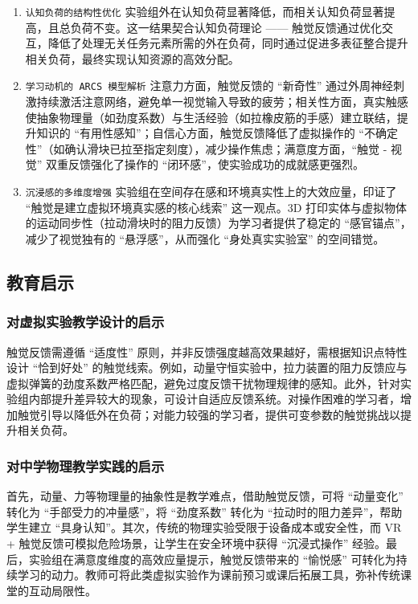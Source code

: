 \documentclass[runningheads]{llncs}
\begin{document}
\begin{enumerate}[label={\arabic*)}]
  \item \texttt{认知负荷的结构性优化} 实验组外在认知负荷显著降低，而相关认知负荷显著提高，且总负荷不变。这一结果契合认知负荷理论 —— 触觉反馈通过优化交互，降低了处理无关任务元素所需的外在负荷，同时通过促进多表征整合提升相关负荷，最终实现认知资源的高效分配。
  \item \texttt{学习动机的 ARCS 模型解析} 注意力方面，触觉反馈的 “新奇性” 通过外周神经刺激持续激活注意网络，避免单一视觉输入导致的疲劳；相关性方面，真实触感使抽象物理量（如劲度系数）与生活经验（如拉橡皮筋的手感）建立联结，提升知识的 “有用性感知”；自信心方面，触觉反馈降低了虚拟操作的 “不确定性”（如确认滑块已拉至指定刻度），减少操作焦虑；满意度方面，“触觉 - 视觉” 双重反馈强化了操作的 “闭环感”，使实验成功的成就感更强烈。
  \item \texttt{沉浸感的多维度增强} 实验组在空间存在感和环境真实性上的大效应量，印证了 “触觉是建立虚拟环境真实感的核心线索” 这一观点。3D 打印实体与虚拟物体的运动同步性（拉动滑块时的阻力反馈）为学习者提供了稳定的 “感官锚点”，减少了视觉独有的 “悬浮感”，从而强化 “身处真实实验室” 的空间错觉。
\end{enumerate}

\subsection{教育启示}
\subsubsection{对虚拟实验教学设计的启示}
触觉反馈需遵循 “适度性” 原则，并非反馈强度越高效果越好，需根据知识点特性设计 “恰到好处” 的触觉线索。例如，动量守恒实验中，拉力装置的阻力反馈应与虚拟弹簧的劲度系数严格匹配，避免过度反馈干扰物理规律的感知。此外，针对实验组内部提升差异较大的现象，可设计自适应反馈系统。对操作困难的学习者，增加触觉引导以降低外在负荷；对能力较强的学习者，提供可变参数的触觉挑战以提升相关负荷。

\subsubsection{对中学物理教学实践的启示}
首先，动量、力等物理量的抽象性是教学难点，借助触觉反馈，可将 “动量变化” 转化为 “手部受力的冲量感”，将 “劲度系数” 转化为 “拉动时的阻力差异”，帮助学生建立 “具身认知”。其次，传统的物理实验受限于设备成本或安全性，而 VR + 触觉反馈可模拟危险场景，让学生在安全环境中获得 “沉浸式操作” 经验。最后，实验组在满意度维度的高效应量提示，触觉反馈带来的 “愉悦感” 可转化为持续学习的动力。教师可将此类虚拟实验作为课前预习或课后拓展工具，弥补传统课堂的互动局限性。
\end{document}

